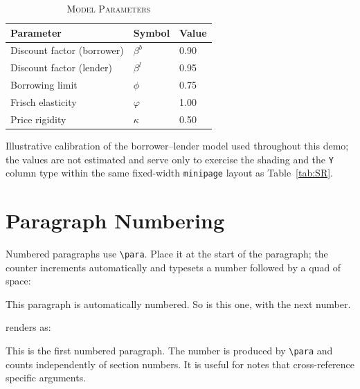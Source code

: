 \documentclass[11pt,a4paper]{article}
\begin{document}
\begin{table}[ht!]
	\centering
	\caption{\scshape{Model Parameters}}
    \begin{minipage}[b]{.7\textwidth}
    \begin{center}\small
    \begin{tabularx}{\textwidth}{lYY}
    \toprule
    \textbf{Parameter} & \textbf{Symbol} & \textbf{Value} \\
    \midrule
     Discount factor (borrower) & $\beta^b$ & 0.90 \\
    Discount factor (lender)  & $\beta^l$ & 0.95 \\
     Borrowing limit           & $\phi$    & 0.75 \\
    Frisch elasticity         & $\varphi$ & 1.00 \\
     Price rigidity            & $\kappa$  & 0.50 \\
    \bottomrule
    \end{tabularx}%
    \end{center}
    \vspace{-.3cm}
    { Illustrative calibration of the borrower--lender model used throughout this demo; the values are not estimated and serve only to exercise the \texttt{\string\rowcolor} shading and the \texttt{Y} column type within the same fixed-width \texttt{minipage} layout as Table~\ref{tab:SR}.\par}
    \label{tab:params}
	\end{minipage}
\end{table}

\section{Paragraph Numbering}

Numbered paragraphs use \verb|\para|. Place it at the start of the paragraph; the counter increments automatically and typesets a number followed by a quad of space:

\begin{democode}
\para This paragraph is automatically numbered.
\para So is this one, with the next number.
\end{democode}

\noindent renders as:

\para This is the first numbered paragraph. The number is produced by \verb|\para| and counts independently of section numbers. It is useful for notes that cross-reference specific arguments.
\end{document}
